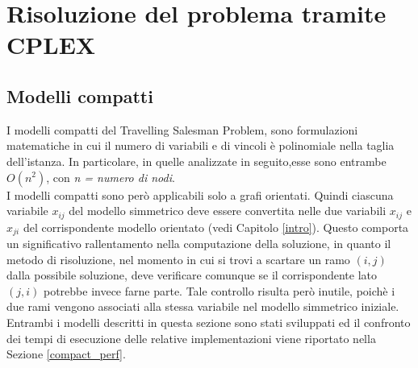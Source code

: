 \chapter{Risoluzione del problema tramite CPLEX}\label{CPLEX}  

\section{Modelli compatti}
I modelli compatti del Travelling Salesman Problem, sono formulazioni matematiche in cui il numero di variabili e di vincoli è polinomiale nella taglia dell'istanza. In particolare, in quelle analizzate in seguito,esse sono entrambe $O(n^2)$, con \textit{n = numero di nodi}.\\
I modelli compatti sono però applicabili solo a grafi orientati. Quindi ciascuna variabile $x_{ij}$ del modello simmetrico deve essere convertita nelle due variabili $x_{ij}$ e $x_{ji}$ del corrispondente modello orientato (vedi Capitolo \ref{intro}). Questo comporta un significativo rallentamento nella computazione della soluzione, in quanto il metodo di risoluzione, nel momento in cui si trovi a scartare un ramo $(i,j)$ dalla possibile soluzione, deve verificare comunque se il corrispondente lato $(j,i)$ potrebbe invece farne parte. Tale controllo risulta però inutile, poichè i due rami vengono associati alla stessa variabile nel modello simmetrico iniziale.
Entrambi i modelli descritti in questa sezione sono stati sviluppati ed il confronto dei tempi di esecuzione delle relative implementazioni viene riportato nella Sezione \ref{compact_perf}.

